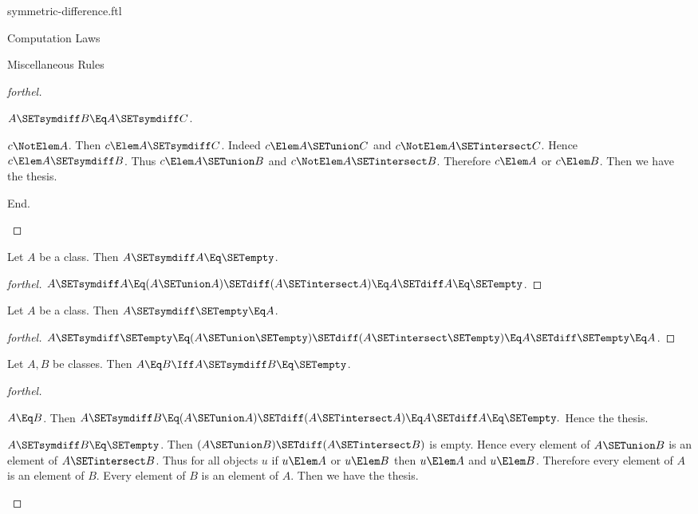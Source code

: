 \documentclass{stex}
\begin{document}
\begin{smodule}{symmetric-difference.ftl}
\begin{sfragment}{Computation Laws}
\begin{sfragment}{Miscellaneous Rules}
\begin{proof}[forthel]
\begin{case}{$A \SETsymdiff B \Eq A \SETsymdiff C$.}
          \begin{case}{$c \NotElem A$.}
            Then $c \Elem A \SETsymdiff C$.
            Indeed $c \Elem A \SETunion C$ and $c \NotElem A \SETintersect C$.
            Hence $c \Elem A \SETsymdiff B$.
            Thus $c \Elem A \SETunion B$ and $c \NotElem A \SETintersect B$.
            Therefore $c \Elem A$ or $c \Elem B$.
            Then we have the thesis.
          \end{case}
        End.
      \end{case}
    \end{proof}

    \begin{proposition}[forthel,id=FOUNDATIONS_03_4578696040022016]
      Let $A$ be a class.
      Then $A \SETsymdiff A \Eq \SETempty$.
    \end{proposition}
    \begin{proof}[forthel]
      $A \SETsymdiff A
        \Eq (A \SETunion A) \SETdiff (A \SETintersect A)
        \Eq A \SETdiff A
        \Eq \SETempty$.
    \end{proof}

    \begin{proposition}[forthel,id=FOUNDATIONS_03_6698730398941184]
      Let $A$ be a class.
      Then $A \SETsymdiff \SETempty \Eq A$.
    \end{proposition}
    \begin{proof}[forthel]
      $A \SETsymdiff \SETempty
        \Eq (A \SETunion \SETempty) \SETdiff (A \SETintersect \SETempty)
        \Eq A \SETdiff \SETempty
        \Eq A$.
    \end{proof}

    \begin{proposition}[forthel,id=FOUNDATIONS_03_6111806917443584]
      Let $A, B$ be classes.
      Then $A \Eq B \Iff A \SETsymdiff B \Eq \SETempty$.
    \end{proposition}
    \begin{proof}[forthel]
      \begin{case}{$A \Eq B$.}
        Then $A \SETsymdiff B
          \Eq (A \SETunion A) \SETdiff (A \SETintersect A)
          \Eq A \SETdiff A
          \Eq \SETempty.$
        Hence the thesis.
      \end{case}

      \begin{case}{$A \SETsymdiff B \Eq \SETempty$.}
        Then $(A \SETunion B) \SETdiff (A \SETintersect B)$ is empty.
        Hence every element of $A \SETunion B$ is an element of $A \SETintersect B$.
        Thus for all objects $u$ if $u \Elem A$ or $u \Elem B$ then $u \Elem A$ and $u \Elem B$.
        Therefore every element of $A$ is an element of $B$.
        Every element of $B$ is an element of $A$.
        Then we have the thesis.
      \end{case}
    \end{proof}
  \end{sfragment}
\end{sfragment}
\end{smodule}
\end{document}
